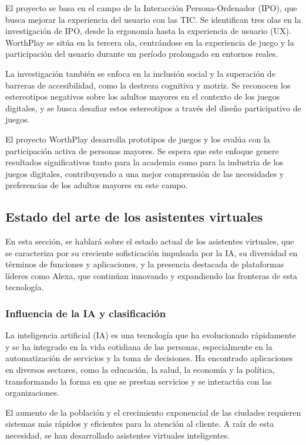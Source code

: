 El proyecto se basa en el campo de la Interacción Persona-Ordenador (IPO), que busca mejorar la experiencia del usuario con las TIC. Se identifican tres olas en la investigación de IPO, desde la ergonomía hasta la experiencia de usuario (UX). WorthPlay se sitúa en la tercera ola, centrándose en la experiencia de juego y la participación del usuario durante un período prolongado en entornos reales.

La investigación también se enfoca en la inclusión social y la superación de barreras de accesibilidad, como la destreza cognitiva y motriz. Se reconocen los estereotipos negativos sobre los adultos mayores en el contexto de los juegos digitales, y se busca desafiar estos estereotipos a través del diseño participativo de juegos.

El proyecto WorthPlay desarrolla prototipos de juegos y los evalúa con la participación activa de personas mayores. Se espera que este enfoque genere resultados significativos tanto para la academia como para la industria de los juegos digitales, contribuyendo a una mejor comprensión de las necesidades y preferencias de los adultos mayores en este campo.


\subsection{Estado del arte de los asistentes virtuales}

En esta sección, se hablará sobre el estado actual de los asistentes virtuales, que se caracteriza por su creciente sofisticación impulsada por la IA, su diversidad en términos de funciones y aplicaciones, y la presencia destacada de plataformas líderes como Alexa, que continúan innovando y expandiendo las fronteras de esta tecnología.

\subsubsection{Influencia de la IA y clasificación}

La inteligencia artificial (IA) es una tecnología que ha evolucionado rápidamente y se ha integrado en la vida cotidiana de las personas, especialmente en la automatización de servicios y la toma de decisiones. Ha encontrado aplicaciones en diversos sectores, como la educación, la salud, la economía y la política, transformando la forma en que se prestan servicios y se interactúa con las organizaciones.

El aumento de la población y el crecimiento exponencial de las ciudades requieren sistemas más rápidos y eficientes para la atención al cliente. A raíz de esta necesidad, se han desarrollado asistentes virtuales inteligentes.

